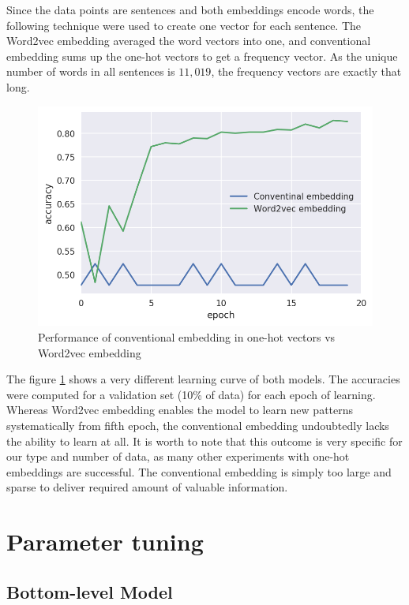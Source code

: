 \documentclass[
  digital, %
  notable,   %
  nolof,     %
  nolot,     %
  draft
]{fithesis3}
\begin{document}
Since the data points are sentences and both embeddings encode words, the following technique were used to create one vector for each sentence.
The Word2vec embedding averaged the word vectors into one, and conventional embedding sums up the one-hot vectors to get a frequency vector.
As the unique number of words in all sentences is $11,019$, the frequency vectors are exactly that long.

\begin{figure}[h]
\caption{Performance of conventional embedding in one-hot vectors vs Word2vec embedding}
\label{fig:eval_word2vec_contribution}
\includegraphics[width=\textwidth]{img/eval_word2vec_contribution}
\end{figure}

The figure \ref{fig:eval_word2vec_contribution} shows a very different learning curve of both models.
The accuracies were computed for a validation set (10\% of data) for each epoch of learning.
Whereas Word2vec embedding enables the model to learn new patterns systematically from fifth epoch, the conventional embedding undoubtedly lacks the ability to learn at all.
It is worth to note that this outcome is very specific for our type and number of data, as many other experiments with one-hot embeddings are successful.  
The conventional embedding is simply too large and sparse to deliver required amount of valuable information.


\section{Parameter tuning}

\subsection{Bottom-level Model}
\label{eval:bottom-model-tuning}
\end{document}
